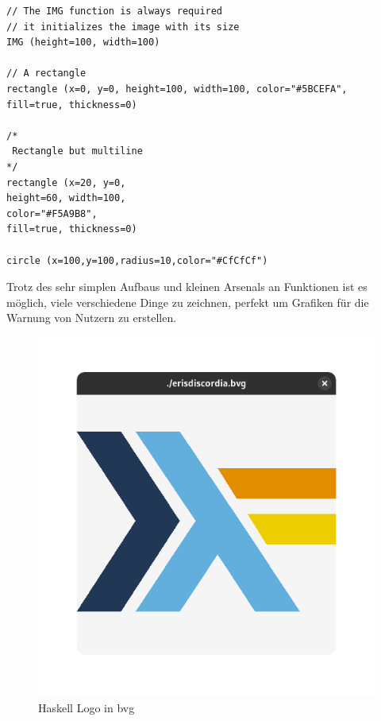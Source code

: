 \begin{verbatim}
// The IMG function is always required
// it initializes the image with its size
IMG (height=100, width=100)

// A rectangle 
rectangle (x=0, y=0, height=100, width=100, color="#5BCEFA", fill=true, thickness=0)

/*
 Rectangle but multiline
*/
rectangle (x=20, y=0,
height=60, width=100,
color="#F5A9B8",
fill=true, thickness=0)

circle (x=100,y=100,radius=10,color="#CfCfCf")
\end{verbatim}
Trotz des sehr simplen Aufbaus und kleinen Arsenals an Funktionen ist es möglich, viele verschiedene Dinge zu zeichnen, perfekt um Grafiken für die Warnung von Nutzern zu erstellen.

\hypersetup{pageanchor=false}
\begin{figure}[h]
  \centering
  \begin{minipage}[c]{0.4\linewidth}
    \includegraphics[width=\linewidth]{realisierung/images/bvg-haskell.png}
    \caption{Haskell Logo in bvg}
  \end{minipage}
  \hfill
  \begin{minipage}[c]{0.4\linewidth}

\end{minipage}
\end{figure}
